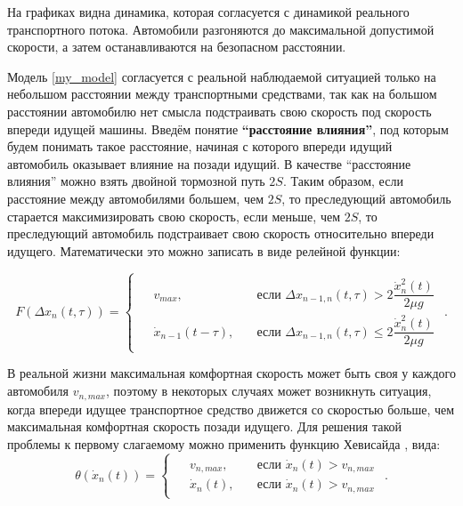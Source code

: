 \documentclass[12pt, a4paper]{extarticle}
\numberwithin{equation}{section}
\numberwithin{figure}{section}
\begin{document}
На графиках видна динамика, которая согласуется с динамикой реального транспортного потока. Автомобили разгоняются до максимальной допустимой скорости, а затем останавливаются на безопасном расстоянии. 

Модель \eqref{my_model} согласуется с реальной наблюдаемой ситуацией только на небольшом расстоянии между транспортными средствами, так как на большом расстоянии автомобилю нет смысла подстраивать свою скорость под скорость впереди идущей машины. Введём понятие \textbf{``расстояние влияния''}, под которым будем понимать такое расстояние, начиная с которого впереди идущий автомобиль оказывает влияние на позади идущий. В качестве ``расстояние влияния'' можно взять двойной тормозной путь $2S$. Таким образом, если расстояние между автомобилями большем, чем  $2S$, то преследующий автомобиль старается максимизировать свою скорость, если меньше, чем  $2S$, то преследующий автомобиль подстраивает свою скорость относительно впереди идущего. Математически это можно записать в виде релейной функции:

\begin{equation*}
F(\Delta x_{n}(t,\tau))=
\begin{cases}
\begin{split}
&v_{max},\quad &\text{если }\Delta x_{n-1,n}(t,\tau) > 2\dfrac{\dot{x}_n^2(t)}{2\mu g} \\
&\dot{x}_{n-1}(t-\tau),\quad &\text{если }\Delta x_{n-1,n}(t,\tau) \leq 2\dfrac{\dot{x}_n^2(t)}{2\mu g}
\end{split}
\end{cases}.
\end{equation*}

В реальной жизни максимальная комфортная скорость может быть своя у каждого автомобиля $v_{n,max}$, поэтому в некоторых случаях может возникнуть ситуация, когда впереди идущее транспортное средство движется со скоростью больше, чем максимальная комфортная скорость позади идущего. Для решения такой проблемы к первому слагаемому можно применить функцию Хевисайда \cite{Heaviside_function}, вида:
\begin{equation*}
\theta(\dot{x}_n(t))=
\begin{cases}
\begin{split}
&v_{n,max},\quad &\text{если }\dot{x}_n(t)>v_{n,max} \\
&\dot{x}_n(t),\quad &\text{если }\dot{x}_n(t)>v_{n,max}
\end{split}
\end{cases}.
\end{equation*}
\end{document}
